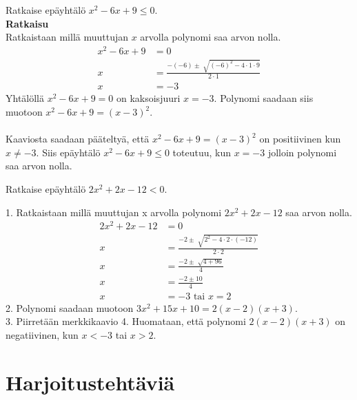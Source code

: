 \begin{esimerkki}
Ratkaise epäyhtälö $x^2-6x+9 \leq 0$. \\
\textbf{Ratkaisu} \\
Ratkaistaan millä muuttujan $x$ arvolla polynomi saa arvon nolla.
\begin{align*}
x^2-6x+9&=0 \\
x&=\frac{-(-6) \pm \sqrt[]{(-6)^2-4 \cdot 1 \cdot 9}}{2 \cdot 1} \\
x&=-3
\end{align*}
Yhtälöllä $x^2-6x+9=0$ on kaksoisjuuri $x=-3$. 
Polynomi saadaan siis muotoon $x^2-6x+9=(x-3)^2$. \\
 \\
Kaaviosta saadaan pääteltyä, että $x^2-6x+9=(x-3)^2$ on positiivinen kun $x \neq -3$. Siis epäyhtälö $x^2-6x+9 \leq 0$ toteutuu, kun $x=-3$ jolloin polynomi saa arvon nolla. 
\end{esimerkki}
\begin{esimerkki}
Ratkaise epäyhtälö $2x^2+2x-12<0$. 
\end{esimerkki}
1. Ratkaistaan millä muuttujan x arvolla polynomi $2x^2+2x-12$ saa arvon nolla.
\begin{align*}
2x^2+2x-12&=0 \\
x&=\frac{-2 \pm \sqrt[]{2^2-4 \cdot 2 \cdot (-12)}}{2 \cdot 2} \\
x&=\frac{-2 \pm \sqrt[]{4+96}}{4} \\
x&=\frac{-2 \pm 10}{4} \\
x&=-3 \text{ tai } x = 2
\end{align*}
2. Polynomi saadaan muotoon $3x^2+15x+10=2(x-2)(x+3)$.  \\
3. Piirretään merkkikaavio
4. Huomataan, että polynomi $2(x-2)(x+3)$ on negatiivinen, kun $x<-3$ tai $x>2$. 
\section{Harjoitustehtäviä}

